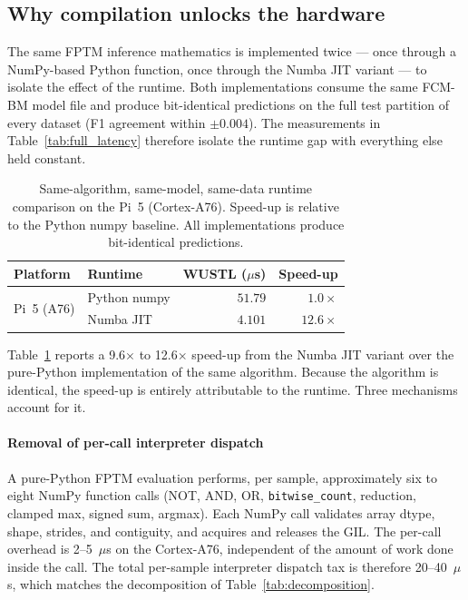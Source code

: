 \documentclass[journal,10pt]{IEEEtran}
\begin{document}
\subsection{Why compilation unlocks the hardware}
\label{sec:res-pynumba}

The same FPTM inference mathematics is implemented twice --- once
through a NumPy-based Python function, once through the Numba JIT variant ---
to isolate the effect of the runtime. Both
implementations consume the same FCM-BM model file and produce
bit-identical predictions on the full test partition of every dataset
(F1 agreement within $\pm 0.004$). The measurements
in Table~\ref{tab:full_latency} therefore isolate the runtime gap
with everything else held constant.

\begin{table}[t]
\centering\small
\caption{Same-algorithm, same-model, same-data runtime comparison on
         the Pi~5 (Cortex-A76). Speed-up is relative to the Python
         numpy baseline.  All implementations produce bit-identical predictions.}
\label{tab:pyvsnumba}
\begin{tabular}{llrr}
\toprule
\textbf{Platform} & \textbf{Runtime} & \textbf{WUSTL ($\mu$s)} & \textbf{Speed-up} \\
\midrule
\multirow{2}{*}{Pi~5 (A76)}
 & Python numpy & $51.79$ & $1.0\times$ \\
 & Numba JIT    & $4.101$ & $\mathbf{12.6\times}$ \\
\bottomrule
\end{tabular}
\end{table}

Table~\ref{tab:pyvsnumba} reports a 9.6$\times$ to 12.6$\times$ speed-up
from the Numba JIT variant over the pure-Python implementation of the same
algorithm. Because the algorithm is identical, the speed-up is entirely
attributable to the runtime. Three mechanisms account for it.

\paragraph{Removal of per-call interpreter dispatch}
A pure-Python FPTM evaluation performs, per sample, approximately
six to eight NumPy function calls (NOT, AND, OR,
\texttt{bitwise\_count}, reduction, clamped max, signed sum, argmax).
Each NumPy call validates array dtype, shape, strides, and
contiguity, and acquires and releases the GIL. The per-call overhead
is 2--5~$\mu$s on the Cortex-A76, independent of the amount of work
done inside the call. The total per-sample interpreter dispatch tax
is therefore 20--40~$\mu$s, which matches the decomposition of
Table~\ref{tab:decomposition}.
\end{document}
